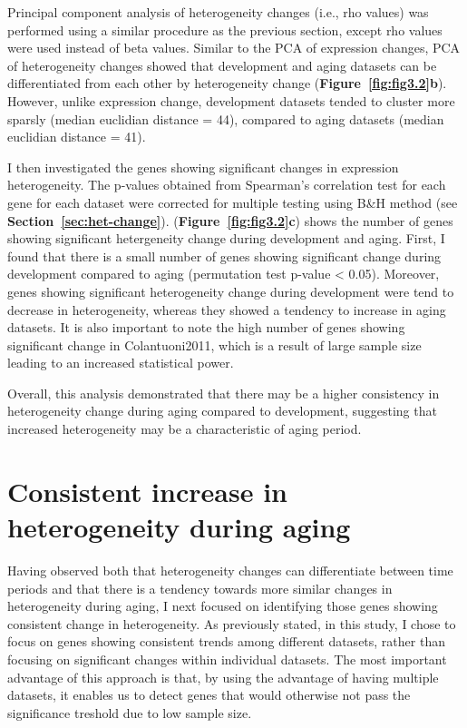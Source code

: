 Principal component analysis of heterogeneity changes (i.e., rho values) was performed using a similar procedure as the previous section, 
except rho values were used instead of beta values. 
Similar to the PCA of expression changes, PCA of heterogeneity changes showed that development and aging datasets can be differentiated from each other by heterogeneity change (\textbf{Figure~\ref{fig:fig3.2}b}).
However, unlike expression change, development datasets tended to cluster more sparsly (median euclidian distance = 44), compared to aging datasets (median euclidian distance = 41).

I then investigated the genes showing significant changes in expression heterogeneity. 
The p-values obtained from Spearman's correlation test for each gene for each dataset were corrected for multiple testing using B{\&}H method (see \textbf{Section~\ref{sec:het-change}}).
(\textbf{Figure~\ref{fig:fig3.2}c}) shows the number of genes showing significant hetergeneity change during development and aging.
First, I found that there is a small number of genes showing significant change during development compared to aging (permutation test p-value < 0.05).
Moreover, genes showing significant heterogeneity change during development were tend to decrease in heterogeneity, whereas they showed a tendency to increase in aging datasets.
It is also important to note the high number of genes showing significant change in Colantuoni2011, which is a result of large sample size leading to an increased statistical power.

Overall, this analysis demonstrated that there may be a higher consistency in heterogeneity change during aging compared to development, 
suggesting that increased heterogeneity may be a characteristic of aging period.

\section{Consistent increase in heterogeneity during aging}
Having observed both that heterogeneity changes can differentiate between time periods and that there is a tendency towards more similar changes in heterogeneity during aging,
I next focused on identifying those genes showing consistent change in heterogeneity.
As previously stated, in this study, I chose to focus on genes showing consistent trends among different datasets, rather than focusing on significant changes within individual datasets.
The most important advantage of this approach is that, by using the advantage of having multiple datasets, 
it enables us to detect genes that would otherwise not pass the significance treshold due to low sample size.

